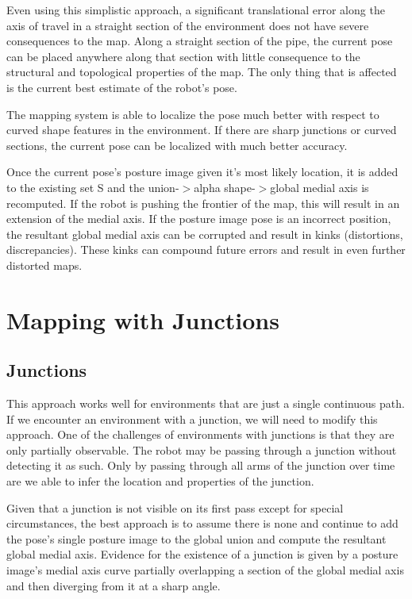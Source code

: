 Even using this simplistic approach, a significant translational error along the axis of travel in a straight section of the environment does not have severe consequences to the map. Along a straight section of the pipe, the current pose can be placed anywhere along that section with little consequence to the structural and topological properties of the map. The only thing that is affected is the current best estimate of the robot’s pose.

The mapping system is able to localize the pose much better with respect to curved shape features in the environment. If there are sharp junctions or curved sections, the current pose can be localized with much better accuracy.

Once the current pose’s posture image given it’s most likely location, it is added to the existing set S and the union-$>$alpha shape-$>$global medial axis is recomputed. If the robot is pushing the frontier of the map, this will result in an extension of the medial axis. If the posture image pose is an incorrect position, the resultant global medial axis can be corrupted and result in kinks (distortions, discrepancies). These kinks can compound future errors and result in even further distorted maps.

\pagebreak 

\chapter{Mapping with Junctions}
\label{mappingwithjunctions}

\section{Junctions}
\label{junctions}

This approach works well for environments that are just a single continuous path. If we encounter an environment with a junction, we will need to modify this approach. One of the challenges of environments with junctions is that they are only partially observable. The robot may be passing through a junction without detecting it as such. Only by passing through all arms of the junction over time are we able to infer the location and properties of the junction. 

Given that a junction is not visible on its first pass except for special circumstances, the best approach is to assume there is none and continue to add the pose’s single posture image to the global union and compute the resultant global medial axis. Evidence for the existence of a junction is given by a posture image’s medial axis curve partially overlapping a section of the global medial axis and then diverging from it at a sharp angle. 

